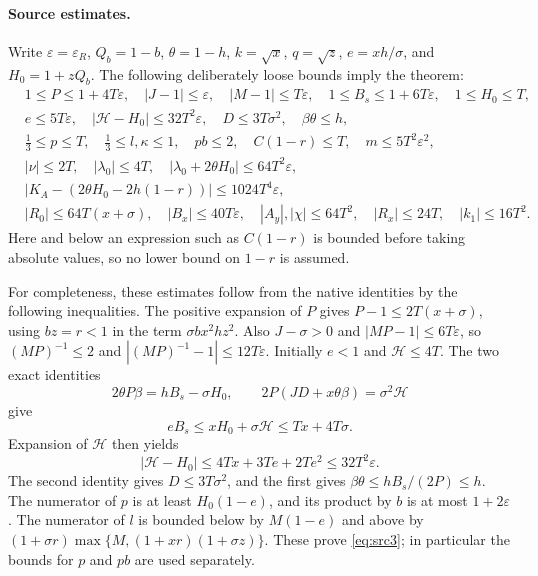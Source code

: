 \documentclass[11pt]{article}
\newcommand{\eps}{\varepsilon}
\newcommand{\sigs}{\sigma}
\begin{document}
\paragraph{Source estimates.}
Write $\eps=\eps_R$, $Q_b=1-b$, $\theta=1-h$, $k=\sqrt x$,
$q=\sqrt z$, $e=xh/\sigs$, and $H_0=1+zQ_b$. The following deliberately
loose bounds imply the theorem:
\begin{align}
 &1\le P\le1+4T\eps,\quad |J-1|\le\eps,\quad |M-1|\le T\eps,
 \quad 1\le B_s\le1+6T\eps,\quad 1\le H_0\le T,\label{eq:src1}\\
 &e\le5T\eps,\quad |\mathcal H-H_0|\le32T^2\eps,
 \quad D\le3T\sigs^2,\quad \beta\theta\le h,\label{eq:src2}\\
 &\tfrac13\le p\le T,\quad \tfrac13\le l,\kappa\le1,
 \quad pb\le2,\quad C(1-r)\le T,\quad m\le5T^2\eps^2,\label{eq:src3}\\
 &|\nu|\le2T,\quad |\lambda_0|\le4T,\quad
 |\lambda_0+2\theta H_0|\le64T^2\eps,\label{eq:src4}\\
 &|K_A-(2\theta H_0-2h(1-r))|\le1024T^4\eps,\label{eq:src5}\\
 &|R_0|\le64T(x+\sigs),\quad |B_x|\le40T\eps,\quad
 |A_y|,|\chi|\le64T^2,\quad |R_x|\le24T,\quad |k_1|\le16T^2.
 \label{eq:src6}
\end{align}
Here and below an expression such as $C(1-r)$ is bounded before taking
absolute values, so no lower bound on $1-r$ is assumed.

For completeness, these estimates follow from the native identities by
the following inequalities. The positive expansion of $P$ gives
$P-1\le2T(x+\sigs)$, using $bz=r<1$ in the term
$\sigs bx^2hz^2$. Also $J-\sigs>0$ and
$|MP-1|\le6T\eps$, so $(MP)^{-1}\le2$ and
$|(MP)^{-1}-1|\le12T\eps$. Initially $e<1$ and
$\mathcal H\le4T$. The two exact identities
\[
 2\theta P\beta=hB_s-\sigs H_0,\qquad
 2P(JD+x\theta\beta)=\sigs^2\mathcal H
\]
give
\[
 eB_s\le xH_0+\sigs\mathcal H\le Tx+4T\sigs.
\]
Expansion of $\mathcal H$ then yields
\[
 |\mathcal H-H_0|\le4Tx+3Te+2Te^2\le32T^2\eps.
\]
The second identity gives $D\le3T\sigs^2$, and the first gives
$\beta\theta\le hB_s/(2P)\le h$. The numerator of $p$ is at least
$H_0(1-e)$, and its product by $b$ is at most $1+2\eps$.
The numerator of $l$ is bounded below by $M(1-e)$ and above by
$(1+\sigs r)\max\{M,(1+xr)(1+\sigs z)\}$.
These prove \eqref{eq:src3}; in particular the bounds for $p$ and $pb$
are used separately.
\end{document}
